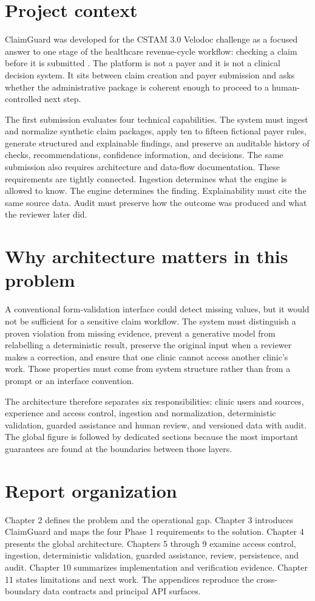 \documentclass[11pt,a4paper,oneside]{report}
\begin{document}
\section{Project context}
ClaimGuard was developed for the CSTAM 3.0 Velodoc challenge as a focused answer to one stage of the healthcare revenue-cycle workflow: checking a claim before it is submitted \cite{cstam-brief}. The platform is not a payer and it is not a clinical decision system. It sits between claim creation and payer submission and asks whether the administrative package is coherent enough to proceed to a human-controlled next step.

The first submission evaluates four technical capabilities. The system must ingest and normalize synthetic claim packages, apply ten to fifteen fictional payer rules, generate structured and explainable findings, and preserve an auditable history of checks, recommendations, confidence information, and decisions. The same submission also requires architecture and data-flow documentation. These requirements are tightly connected. Ingestion determines what the engine is allowed to know. The engine determines the finding. Explainability must cite the same source data. Audit must preserve how the outcome was produced and what the reviewer later did.

\section{Why architecture matters in this problem}
A conventional form-validation interface could detect missing values, but it would not be sufficient for a sensitive claim workflow. The system must distinguish a proven violation from missing evidence, prevent a generative model from relabelling a deterministic result, preserve the original input when a reviewer makes a correction, and ensure that one clinic cannot access another clinic's work. Those properties must come from system structure rather than from a prompt or an interface convention.

The architecture therefore separates six responsibilities: clinic users and sources, experience and access control, ingestion and normalization, deterministic validation, guarded assistance and human review, and versioned data with audit. The global figure is followed by dedicated sections because the most important guarantees are found at the boundaries between those layers.

\section{Report organization}
Chapter 2 defines the problem and the operational gap. Chapter 3 introduces ClaimGuard and maps the four Phase 1 requirements to the solution. Chapter 4 presents the global architecture. Chapters 5 through 9 examine access control, ingestion, deterministic validation, guarded assistance, review, persistence, and audit. Chapter 10 summarizes implementation and verification evidence. Chapter 11 states limitations and next work. The appendices reproduce the cross-boundary data contracts and principal API surfaces.
\end{document}
